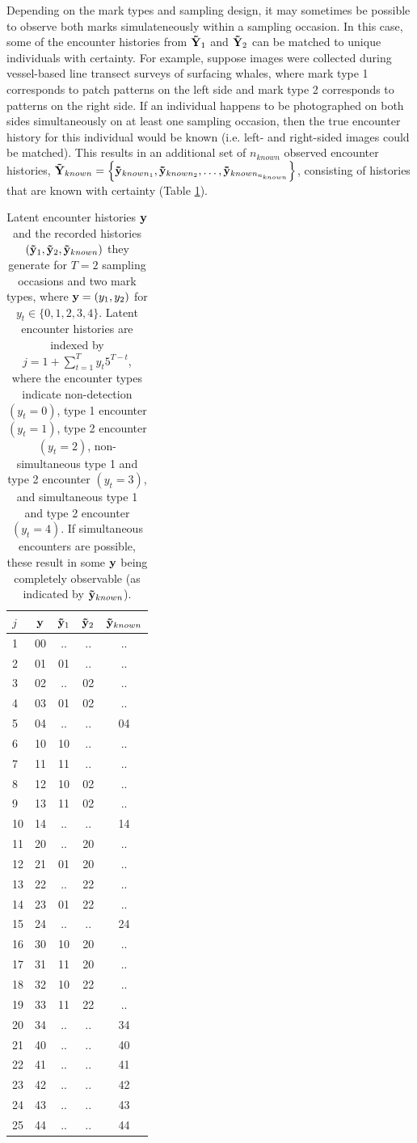 \documentclass[12pt]{article}
\begin{document}
Depending on the mark types and sampling design, it may sometimes be possible to observe both marks simulateneously within a sampling occasion. In this case, some of the encounter histories from ${\bf {\tilde Y}}_1$ and ${\bf {\tilde Y}}_2$ can be matched to unique individuals with certainty. For example, suppose images were collected during vessel-based line transect surveys of surfacing whales, where mark type 1 corresponds to patch patterns on the left side and mark type 2 corresponds to patterns on the right side. If an individual happens to be photographed on both sides simultaneously on at least one sampling occasion, then the true encounter history for this individual would be known (i.e. left- and right-sided images could be matched). This results in an additional set of $n_{known}$ observed encounter histories, ${\bf {\tilde Y}}_{known} = \left\{{\bf {\tilde y}}_{known_1},{\bf {\tilde y}}_{known_2},\ldots,{\bf {\tilde y}}_{known_{n_{known}}}\right\}$, consisting of histories that are known with certainty (Table \ref{tab:hist}).

\begin{table}
  \caption{\label{tab:hist} Latent encounter histories ${\bf y}$ and the recorded histories $({\bf {\tilde y}}_1, {\bf {\tilde y}}_2, {\bf {\tilde y}}_{known})$ they generate for $T=2$ sampling occasions and two mark types, where ${\bf y}=\left(y_1,y_2\right)$ for $y_t \in \{0,1,2,3,4\}$. Latent encounter histories are indexed by $j=1+\sum_{t=1}^T y_t 5^{T-t}$, where the encounter types indicate non-detection $(y_t=0)$, type 1 encounter $(y_t=1)$, type 2 encounter $(y_t=2)$, non-simultaneous type 1 and type 2 encounter $(y_t=3)$, and simultaneous type 1 and type 2 encounter $(y_t=4)$. If simultaneous encounters are possible, these result in some ${\bf y}$ being completely observable (as indicated by ${\bf {\tilde y}}_{known}$).}
  \begin{tabular}{lc|ccc}
  \hline 
  $j$ & ${\bf y}$ & ${\bf {\tilde y}}_1$ &  ${\bf {\tilde y}}_2$ & ${\bf {\tilde y}}_{known}$ \tabularnewline
  \hline 
  1 & 00 & .. & .. & .. \tabularnewline
  2 & 01 & 01 & .. & .. \tabularnewline
  3 & 02 & .. & 02 & .. \tabularnewline
  4 & 03 & 01 & 02 & .. \tabularnewline
  5 & 04 & .. & .. & 04 \tabularnewline
  6 & 10 & 10 & .. & .. \tabularnewline
  7 & 11 & 11 & .. & .. \tabularnewline
  8 & 12 & 10 & 02 & .. \tabularnewline
  9 & 13 & 11 & 02 & .. \tabularnewline
  10 & 14 & .. & .. & 14 \tabularnewline
  11 & 20 & .. & 20 & .. \tabularnewline
  12 & 21 & 01 & 20 & .. \tabularnewline
  13 & 22 & .. & 22 & .. \tabularnewline
  14 & 23 & 01 & 22 & .. \tabularnewline
  15 & 24 & .. & .. & 24 \tabularnewline
  16 & 30 & 10 & 20 & .. \tabularnewline
  17 & 31 & 11 & 20 & .. \tabularnewline
  18 & 32 & 10 & 22 & .. \tabularnewline
  19 & 33 & 11 & 22 & .. \tabularnewline
  20 & 34 & .. & .. & 34 \tabularnewline
  21 & 40 & .. & .. & 40 \tabularnewline
  22 & 41 & .. & .. & 41 \tabularnewline
  23 & 42 & .. & .. & 42 \tabularnewline
  24 & 43 & .. & .. & 43 \tabularnewline
  25 & 44 & .. & .. & 44 \tabularnewline
  \hline 
  \end{tabular}
\end{table}
\end{document}
